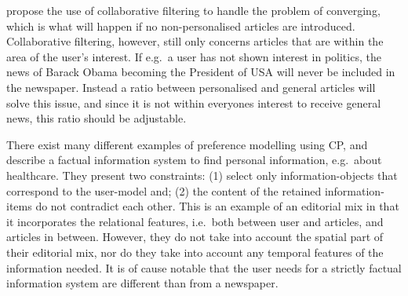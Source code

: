 %
%
\cite{fulltext.pdf} propose the use of collaborative filtering to handle the problem of converging, which is what will happen if no non-personalised articles are introduced. Collaborative filtering, however, still only concerns articles that are within the area of the user's interest. If e.g.\ a user has not shown interest in politics, the news of Barack Obama becoming the President of USA will never be included in the newspaper. Instead a ratio between personalised and general articles will solve this issue, and since it is not within everyones interest to receive general news, this ratio should be adjustable.
%
%

There exist many different examples of preference modelling using CP, and \cite{Constraint-Satisfaction-Methods-for-Information-Personalization.pdf} describe a factual information system to find personal information, e.g.\ about healthcare. They present two constraints: (1) select only information-objects that correspond to the user-model and; (2) the content of the retained information-items do not contradict each other. This is an example of an editorial mix in that it incorporates the relational features, i.e.\ both between user and articles, and articles in between. However, they do not take into account the spatial part of their editorial mix, nor do they take into account any temporal features of the information needed. It is of cause notable that the user needs for a strictly factual information system are different than from a newspaper.

